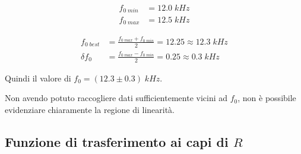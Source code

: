\documentclass[11pt, a4paper]{article}
\numberwithin{equation}{section} %
\begin{document}

\begin{align*}
    f_{0 \; min} &= 12.0 \; kHz \\
    f_{0 \; max} &= 12.5 \; kHz
\end{align*}

\begin{align*}
    f_{0 \; best} &= \frac{f_{0 \; max} + f_{0 \; min}}{2} = 12.25 \approx 12.3 \; kHz \\
    \delta f_{0} &= \frac{f_{0 \; max} - f_{0 \; min}}{2} = 0.25 \approx 0.3 \; kHz
\end{align*}

Quindi il valore di \(f_{0} = (12.3 \pm 0.3) \; kHz\).

\hline

%
%

Non avendo potuto raccogliere dati sufficientemente vicini ad $f_{0}$, non è possibile evidenziare chiaramente la regione di linearità. %



\newpage

\subsection{Funzione di trasferimento ai capi di $R$}
\end{document}
